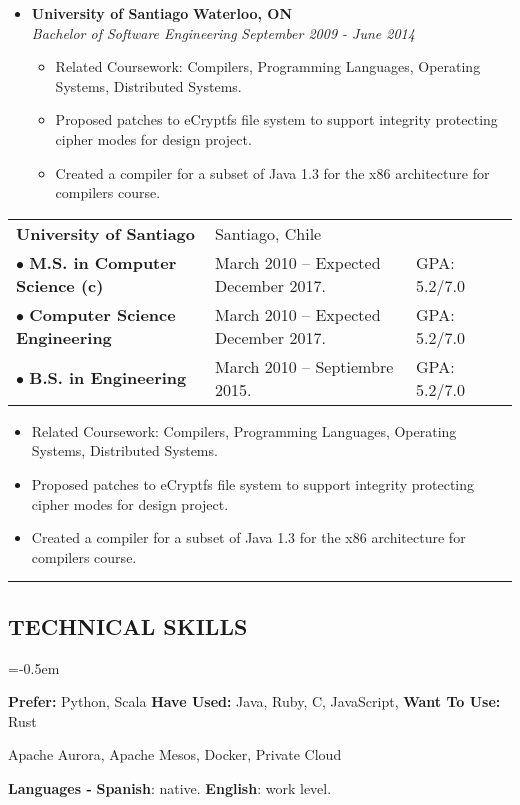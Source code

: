 \documentclass[10pt,letterpaper]{article}
\newcommand{\CPP}
{C\nolinebreak[4]\hspace{-.05em}\raisebox{.22ex}{\footnotesize\bf ++}}
\begin{document}
  \begin{itemize}[leftmargin=*]
    \parskip=-0.5em
    
    \item[]
    {\textbf{University of Santiago} \hfill
      \textbf{Waterloo, ON}
    }
    \\
    {\emph{Bachelor of Software Engineering} \hfill
      \emph{September 2009 - June 2014}}
    
    \begin{itemize}[label=\textbullet]
      \item Related Coursework: Compilers, Programming Languages, Operating
      Systems, Distributed Systems.
      \item Proposed patches to eCryptfs file system to support
      integrity protecting cipher modes for design project.
      \item Created a compiler for a subset of Java 1.3 for the
      x86 architecture for compilers course.
    \end{itemize}
  \end{itemize}
  
  \begin{tabular}{lllc} 
    \textbf{University of Santiago}&Santiago, Chile& & \\
    $\bullet$  \textbf{M.S. in Computer Science (c)}& March 2010 – Expected December 2017. & GPA: 5.2/7.0 & \\
    $\bullet$  \textbf{Computer Science Engineering} & March 2010 – Expected December 2017. & GPA: 5.2/7.0 & \\
    $\bullet$  \textbf{B.S. in Engineering} & March 2010 – Septiembre 2015. & GPA: 5.2/7.0  &\\
  \end{tabular}
  
  \begin{itemize}[label=\textbullet]
    \item Related Coursework: Compilers, Programming Languages, Operating
    Systems, Distributed Systems.
    \item Proposed patches to eCryptfs file system to support
    integrity protecting cipher modes for design project.
    \item Created a compiler for a subset of Java 1.3 for the
    x86 architecture for compilers course.
  \end{itemize}
  
  \hrule
  \vspace{-1.0em}
  
  \subsection*{TECHNICAL SKILLS}
  \begin{description}[labelindent=\parindent]
    \parskip=-0.5em
    \item[Languages:] \textbf{Prefer:} Python, Scala \textbf{Have Used:} Java, Ruby, \CPP, JavaScript, \textbf{Want To Use:} Rust
    \item[Systems:] Apache Aurora, Apache Mesos, Docker, Private Cloud
  \end{description}
  
  \vspace{-1.0em}
  \begin{center}
    \textbf{Languages - } \textbf{Spanish}: native. \textbf{English}: work level.
  \end{center}
  
\end{document}
